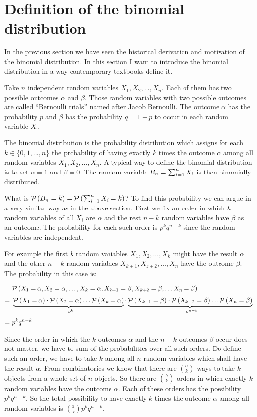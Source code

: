 \section{Definition of the binomial distribution}

In the previous section we have seen the historical derivation and motivation of the binomial distribution. In this section I want to introduce the binomial distribution in a way contemporary textbooks define it. 

Take $n$ independent random variables $X_1, X_2, \ldots, X_n$. Each of them has two possible outcomes $\alpha$ and $\beta$. Those random variables with two possible outcomes are called ``Bernoulli trials'' named after Jacob Bernoulli.  The outcome $\alpha$ has the probability $p$ and $\beta$ has the probability $q=1-p$ to occur in each random variable $X_i$. 

The binomial distribution is the probability distribution which assigns for each $k\in \{0,1,\ldots,n\}$ the probability of having exactly $k$ times the outcome $\alpha$ among all random variables $X_1,X_2,\ldots,X_n$. A typical way to define the binomial distribution is to set $\alpha=1$ and $\beta=0$. The random variable $B_{n}=\sum_{i=1}^n X_i$ is then binomially distributed.

What is $\mathcal P\left({B_{n} = k}\right) = \mathcal P\left({\sum_{i=1}^n X_i=k}\right)$? To find this probability we can argue in a very similar way as in the above section. First we fix an order in which $k$ random variables of all $X_i$ are $\alpha$ and the rest $n-k$ random variables have $\beta$ as an outcome. The probability for each such order is $p^kq^{n-k}$ since the random variables are independent.

For example the first $k$ random variables $X_1,X_2,\ldots,X_k$ might have the result $\alpha$ and the other $n-k$ random variables $X_{k+1},X_{k+2},\ldots,X_n$ have the outcome $\beta$. The probability in this case is:

\begin{align}
  & \P{X_1=\alpha, X_2=\alpha, \ldots, X_k=\alpha,X_{k+1}=\beta, X_{k+2}=\beta, \ldots X_n =\beta} \nl
  =\ & \underbrace{\P{X_1=\alpha} \cdot \P{ X_2=\alpha} \ldots \P{X_k=\alpha}}_{=p^k} \cdot \underbrace{\P{X_{k+1}=\beta} \cdot \P{X_{k+2}=\beta} \ldots \P{X_n =\beta}}_{= q^{n-k}} \nl
  =\ & p^kq^{n-k}
\end{align}

Since the order in which the $k$ outcomes $\alpha$ and the $n-k$ outcomes $\beta$ occur does not matter, we have to sum of the probabilities over all such orders. Do define such an order, we have to take $k$ among all $n$ random variables which shall have the result $\alpha$. From combinatorics we know that there are $\binom nk$ ways to take $k$ objects from a whole set of $n$ objects. So there are $\binom bk$ orders in which exactly $k$ random variables have the outcome $\alpha$. Each of these orders has the possibility $p^kq^{n-k}$. So the total possibility to have exactly $k$ times the outcome $\alpha$ among all random variables is $\binom nk p^kq^{n-k}$.

